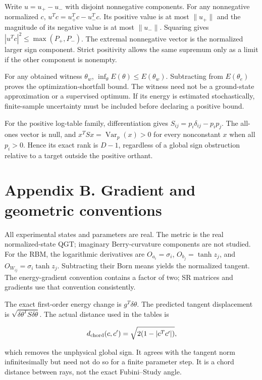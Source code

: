 \documentclass[
  11pt,
  a4paper,
]{article}
\begin{document}
Write \(u=u_+-u_-\) with disjoint nonnegative components. For any
nonnegative normalized \(c\), \(u^Tc=u_+^Tc-u_-^Tc\). Its positive value
is at most \(\|u_+\|\) and the magnitude of its negative value is at
most \(\|u_-\|\). Squaring gives \(|u^Tc|^2\le\max(P_+,P_-)\). The
extremal nonnegative vector is the normalized larger sign component.
Strict positivity allows the same supremum only as a limit if the other
component is nonempty.

For any obtained witness \(\theta_w\),
\(\inf_\theta E(\theta)\le E(\theta_w)\). Subtracting from
\(E(\theta_e)\) proves the optimization-shortfall bound. The witness
need not be a ground-state approximation or a supervised optimum. If its
energy is estimated stochastically, finite-sample uncertainty must be
included before declaring a positive bound.

For the positive log-table family, differentiation gives
\(S_{ij}=p_i\delta_{ij}-p_ip_j\). The all-ones vector is null, and
\(x^TSx=\operatorname{Var}_p(x)>0\) for every nonconstant \(x\) when all
\(p_i>0\). Hence its exact rank is \(D-1\), regardless of a global sign
obstruction relative to a target outside the positive orthant.

\hypertarget{appendix-b.-gradient-and-geometric-conventions}{%
\section{Appendix B. Gradient and geometric
conventions}\label{appendix-b.-gradient-and-geometric-conventions}}

All experimental states and parameters are real. The metric is the real
normalized-state QGT; imaginary Berry-curvature components are not
studied. For the RBM, the logarithmic derivatives are
\(O_{a_i}=\sigma_i\), \(O_{b_j}=\tanh z_j\), and
\(O_{W_{ij}}=\sigma_i\tanh z_j\). Subtracting their Born means yields
the normalized tangent. The energy-gradient convention contains a factor
of two; SR matrices and gradients use that convention consistently.

The exact first-order energy change is \(g^T\delta\theta\). The
predicted tangent displacement is
\(\sqrt{\delta\theta^TS\delta\theta}\). The actual distance used in the
tables is

\[d_{\rm chord}(c,c')=\sqrt{2(1-|c^Tc'|)},\]

which removes the unphysical global sign. It agrees with the tangent
norm infinitesimally but need not do so for a finite parameter step. It
is a chord distance between rays, not the exact Fubini--Study angle.
\end{document}
